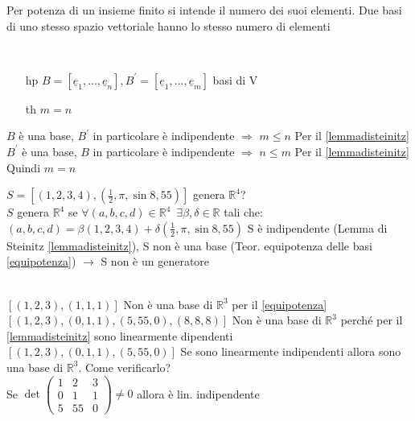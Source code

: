 \begin{teorema}\label{equipotenza}
	Per potenza di un insieme finito si intende il numero dei suoi elementi. Due basi di uno stesso spazio vettoriale hanno lo stesso numero di elementi
	\begin{dimostrazione}
		\phantom{}\\
		\begin{itemize}
			\item[hp] $B=[\underline{e}_1,...,\underline{e}_n], B^{'}=[\underline{e}_1,...,\underline{e}_m]$ basi di V
			\item[th] $m=n$
		\end{itemize}
		$B$ è una base, $B^{'}$ in particolare è indipendente $\Longrightarrow$ $m\leqslant n$ Per il \ref{lemmadisteinitz}\\
		$B^{'}$ è una base, $B$ in particolare è indipendente $\Longrightarrow$ $n\leqslant m$ Per il \ref{lemmadisteinitz}\\
		Quindi $m=n$
	\end{dimostrazione}
	\begin{esercizio}
		$S=[(1,2,3,4),(\frac{1}{2},\pi,\sin 8, 55)]$ genera $\mathbb{R}^4$?\\
		$S$ genera $\mathbb{R}^4$ se $\forall(a,b,c,d)\in\mathbb{R}^4\phantom{1}\exists\beta,\delta\in\mathbb{R}$ tali che:\\ 
		$(a,b,c,d)=\beta(1,2,3,4)+\delta(\frac{1}{2},\pi,\sin 8, 55)$
		S è indipendente (Lemma di Steinitz \ref{lemmadisteinitz}), S non è una base (Teor. equipotenza delle basi \ref{equipotenza}) $\longrightarrow$ S non è un generatore
	\end{esercizio}
	\begin{osservazione}
		\phantom{}\\
		$[(1,2,3),(1,1,1)]$ Non è una base di $\mathbb{R}^3$ per il \ref{equipotenza}\\
		$[(1,2,3),(0,1,1),(5,55,0),(8,8,8)]$ Non è una base di $\mathbb{R}^3$ perché per il \ref{lemmadisteinitz} sono linearmente dipendenti\\
		$[(1,2,3),(0,1,1),(5,55,0)]$ Se sono linearmente indipendenti allora sono una base di $\mathbb{R}^3$. Come verificarlo?\\
		Se $\det\begin{pmatrix}
			1 & 2 & 3\\
			0 & 1 & 1\\
			5 & 55& 0
		\end{pmatrix}\neq 0$ allora è lin. indipendente
	\end{osservazione}
\end{teorema}

